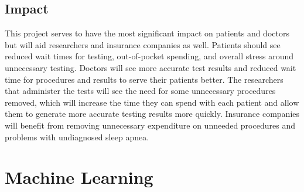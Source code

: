 \documentclass[10pt,conference,a4paper]{IEEEtran}
\begin{document}
\subsection{Impact}

This project serves to have the most significant impact on patients and doctors but will aid researchers and insurance companies as well. Patients should see reduced wait times for testing, out-of-pocket spending, and overall stress around unnecessary testing. Doctors will see more accurate test results and reduced wait time for procedures and results to serve their patients better. The researchers that administer the tests will see the need for some unnecessary procedures removed, which will increase the time they can spend with each patient and allow them to generate more accurate testing results more quickly. Insurance companies will benefit from removing unnecessary expenditure on unneeded procedures and problems with undiagnosed sleep apnea.\par

\section{Machine Learning}
\label{machine_learning}
\end{document}
